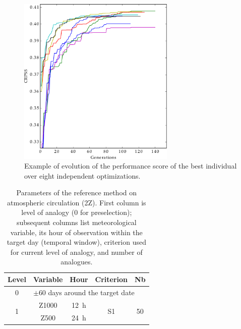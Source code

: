 \documentclass[review]{elsarticle}
\begin{document}
\begin{figure}[t]
	\centerline{\includegraphics[width=7.5cm]{figures/fig11.pdf}}
	\caption{Example of evolution of the performance score of the best individual over eight independent optimizations.}
	\label{fig:evolution}
\end{figure}

\clearpage


\begin{table}[t]
	\caption{Parameters of the reference method on atmospheric circulation (2Z). First column is level of analogy (0 for preselection); subsequent columns list meteorological variable, its hour of observation within the target day (temporal window), criterion used for current level of analogy, and number of analogues.}
	\footnotesize
	\begin{center}
		\begin{tabular}{ccccc}
			\hline
			Level & Variable & Hour & Criterion & Nb \\ 
			\hline 
			0 & \multicolumn{4}{l}{$\pm 60$ days around the target date} \\
			\hline 
			\multirow{2}{*}{1} & Z1000 & 12~h & \multirow{2}{*}{S1} & \multirow{2}{*}{50} \\
			& Z500 & 24~h & & \\ 
			\hline 
		\end{tabular} 
	\end{center}
	\label{table:params_R1}
\end{table}
\end{document}
